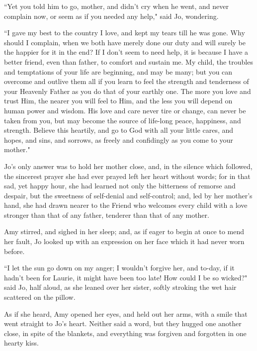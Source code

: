 ``Yet you told him to go, mother, and didn't cry when he
went, and never complain now, or seem as if you needed any help," said
Jo, wondering.

``I gave my best to the country I love, and kept my tears till he was
gone. Why should I complain, when we both have merely done our duty and
will surely be the happier for it in the end? If I don't
seem to need help, it is because I have a better friend, even than
father, to comfort and sustain me. My child, the troubles and
temptations of your life are beginning, and may be many; but you can
overcome and outlive them all if you learn to feel the strength and
tenderness of your Heavenly Father as you do that of your earthly one.
The more you love and trust Him, the nearer you will feel to Him, and
the less you will depend on human power and wisdom. His love and care
never tire or change, can never be taken from you, but may become the
source of life-long peace, happiness, and strength. Believe this
heartily, and go to God with all your little cares, and hopes, and sins,
and sorrows, as freely and confidingly as you come to your mother."

Jo's only answer was to hold her mother close, and, in
the silence which followed, the sincerest prayer she had ever prayed
left her heart without words; for in that sad, yet happy hour, she had
learned not only the bitterness of remorse and despair, but the
sweetness of self-denial and self-control; and, led by her
mother's hand, she had drawn nearer to the Friend who
welcomes every child with a love stronger than that of any father,
tenderer than that of any mother.

Amy stirred, and sighed in her sleep; and, as if eager to begin at once
to mend her fault, Jo looked up with an expression on her face which it
had never worn before.

``I let the sun go down on my anger; I wouldn't forgive
her, and to-day, if it hadn't been for Laurie, it might
have been too late! How could I be so wicked?" said Jo, half aloud, as
she leaned over her sister, softly stroking the wet hair scattered on
the pillow.

As if she heard, Amy opened her eyes, and held out her arms, with a
smile that went straight to Jo's heart. Neither said a
word, but they hugged one another close, in spite of the blankets, and
everything was forgiven and forgotten in one hearty kiss.
